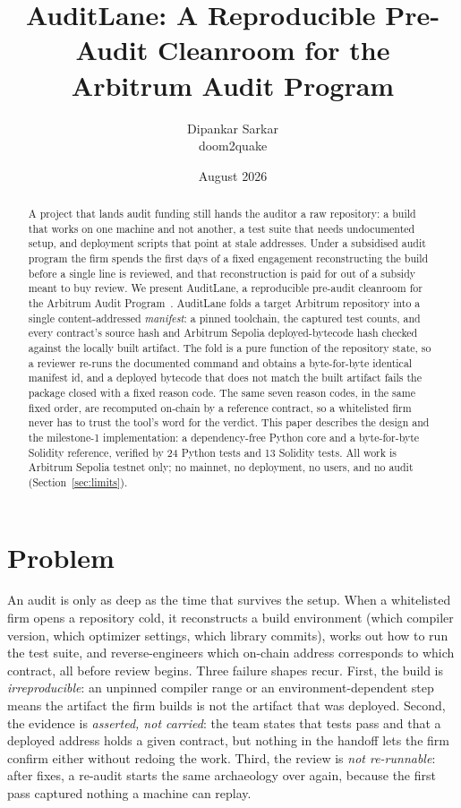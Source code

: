 \documentclass[11pt]{article}
\title{AuditLane: A Reproducible Pre-Audit Cleanroom for the\\ Arbitrum Audit Program}
\author{Dipankar Sarkar \\ \small doom2quake}
\date{August 2026}
\begin{document}
\maketitle

\begin{abstract}
A project that lands audit funding still hands the auditor a raw repository: a build that
works on one machine and not another, a test suite that needs undocumented setup, and
deployment scripts that point at stale addresses. Under a subsidised audit program the
firm spends the first days of a fixed engagement reconstructing the build before a single
line is reviewed, and that reconstruction is paid for out of a subsidy meant to buy
review. We present AuditLane, a reproducible pre-audit cleanroom for the Arbitrum Audit
Program~\cite{arbaudit}. AuditLane folds a target Arbitrum repository into a single
content-addressed \emph{manifest}: a pinned toolchain, the captured test counts, and every
contract's source hash and Arbitrum Sepolia deployed-bytecode hash checked against the
locally built artifact. The fold is a pure function of the repository state, so a reviewer
re-runs the documented command and obtains a byte-for-byte identical manifest id, and a
deployed bytecode that does not match the built artifact fails the package closed with a
fixed reason code. The same seven reason codes, in the same fixed order, are recomputed
on-chain by a reference contract, so a whitelisted firm never has to trust the tool's word
for the verdict. This paper describes the design and the milestone-1 implementation: a
dependency-free Python core and a byte-for-byte Solidity reference, verified by 24 Python
tests and 13 Solidity tests. All work is Arbitrum Sepolia testnet only; no mainnet, no
deployment, no users, and no audit (Section~\ref{sec:limits}).
\end{abstract}

\section{Problem}
An audit is only as deep as the time that survives the setup. When a whitelisted firm
opens a repository cold, it reconstructs a build environment (which compiler version,
which optimizer settings, which library commits), works out how to run the test suite,
and reverse-engineers which on-chain address corresponds to which contract, all before
review begins. Three failure shapes recur. First, the build is \emph{irreproducible}: an
unpinned compiler range or an environment-dependent step means the artifact the firm
builds is not the artifact that was deployed. Second, the evidence is \emph{asserted, not
carried}: the team states that tests pass and that a deployed address holds a given
contract, but nothing in the handoff lets the firm confirm either without redoing the
work. Third, the review is \emph{not re-runnable}: after fixes, a re-audit starts the
same archaeology over again, because the first pass captured nothing a machine can replay.
\end{document}
